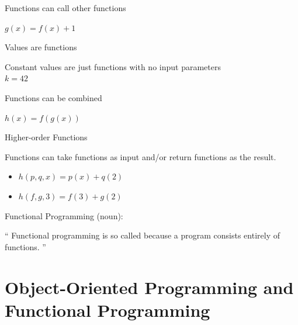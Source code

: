 \documentclass{beamer}
\begin{document}
\begin{frame}{Functions can call other functions}

  {\Huge $g(x) = f(x) + 1$}

\end{frame}

\begin{frame}{Values are functions}

  {\large Constant values are just functions with no input parameters}
  \\
  {\Huge $k = 42$}

\end{frame}

\begin{frame}{Functions can be combined}

  {\Huge $h(x) = f(g(x))$}

\end{frame}

\begin{frame}{Higher-order Functions}

  {\Large Functions can take functions as input and/or return
    functions as the result.}

  \begin{itemize}[<+->]
  \item {\Huge $h(p, q, x) = p(x) + q(2)$}
  \item {\Huge $h(f, g, 3) = f(3) + g(2)$}
  \end{itemize}

\end{frame}

\begin{frame}{Functional Programming (noun):}

  \begin{exampleblock}{}
    {\Large ``
      Functional programming is so called because a program consists entirely of functions.
      ''}
    \vskip5mm
    \hspace*{}
  \end{exampleblock}

  
\end{frame}

\section{Object-Oriented Programming and Functional Programming}
\end{document}
